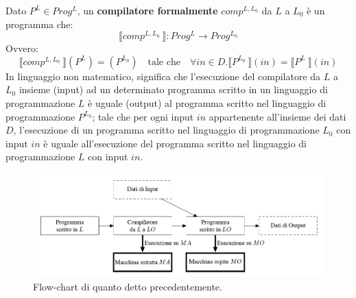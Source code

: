 \documentclass[a4paper]{article}
\newcommand{\exec}[1]{\llbracket #1\:\rrbracket}
\begin{document}
	Dato $P^{L} \in Prog^{L}$, un \textbf{compilatore formalmente} $comp^{L,L_{0}}$ da $L$ a $L_{0}$ è un programma che:
	\begin{equation*}
		\exec{comp^{L,L_{0}}}: Prog^{L} \rightarrow Prog^{L_{0}}
	\end{equation*}
	Ovvero:
	\begin{equation*}
		\exec{comp^{L,L_{0}}}\left(P^{L}\right) = \left(P^{L_{0}}\right) \hspace{1em} \text{tale che} \hspace{1em} \forall in \in D.\exec{P^{L_{0}}}\left(in\right) = \exec{P^{L}}\left(in\right)
	\end{equation*}
	In linguaggio non matematico, significa che l'esecuzione del compilatore da $L$ a $L_{0}$ insieme (input) ad un determinato programma scritto in un linguaggio di programmazione $L$ è uguale (output) al programma scritto nel linguaggio di programmazione $P^{L_{0}}$; tale che per ogni input $in$ appartenente all'insieme dei dati $D$, l'esecuzione di un programma scritto nel linguaggio di programmazione $L_{0}$ con input $in$ è uguale all'esecuzione del programma scritto nel linguaggio di programmazione $L$ con input $in$.\newpage
	
	\begin{figure}[!htp]
		\centering
		\includegraphics[width=\textwidth]{img/ex1-3.png}
		\caption*{Flow-chart di quanto detto precedentemente.}
	\end{figure}
	
\end{document}
